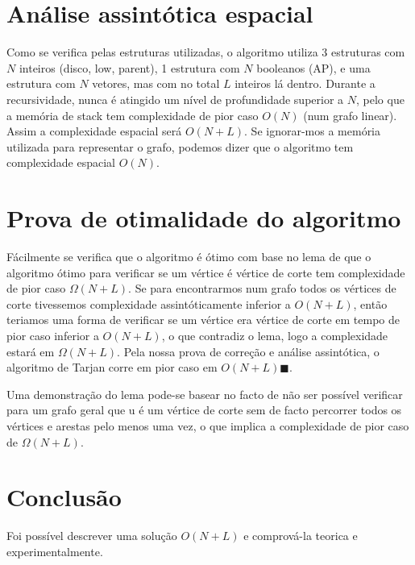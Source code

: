 \documentclass{scrartcl}
\begin{document}
\section*{Análise assintótica espacial}
Como se verifica pelas estruturas utilizadas, o algoritmo utiliza 3 estruturas com $N$ inteiros (disco, low, parent), 1 estrutura com $N$ booleanos (AP), e uma estrutura com $N$ vetores, mas com no total $L$ inteiros lá dentro. Durante a recursividade, nunca é atingido um nível de profundidade superior a $N$, pelo que a memória de stack tem complexidade de pior caso $O(N)$ (num grafo linear). Assim a complexidade espacial será $O(N+L)$. Se ignorar-mos a memória utilizada para representar o grafo, podemos dizer que o algoritmo tem complexidade espacial $O(N)$.

\section*{Prova de otimalidade do algoritmo}
Fácilmente se verifica que o algoritmo é ótimo com base no lema de que o algoritmo ótimo para verificar se um vértice é vértice de corte tem complexidade de pior caso $\Omega(N+L)$. Se para encontrarmos num grafo todos os vértices de corte tivessemos complexidade assintóticamente inferior a $O(N+L)$, então teriamos uma forma de verificar se um vértice era vértice de corte em tempo de pior caso inferior a $O(N+L)$, o que contradiz o lema, logo a complexidade estará em $\Omega (N+L)$. Pela nossa prova de correção e análise assintótica, o algoritmo de Tarjan corre em pior caso em $ O(N+L) \blacksquare$. 

Uma demonstração do lema pode-se basear no facto de não ser possível verificar para um grafo geral que u é um vértice de corte sem de facto percorrer todos os vértices e arestas pelo menos uma vez, o que implica a complexidade de pior caso de  $\Omega (N+L)$.


\section*{Conclusão}
Foi possível descrever uma solução $O(N+L)$ e comprová-la teorica e experimentalmente. 


\end{document}
